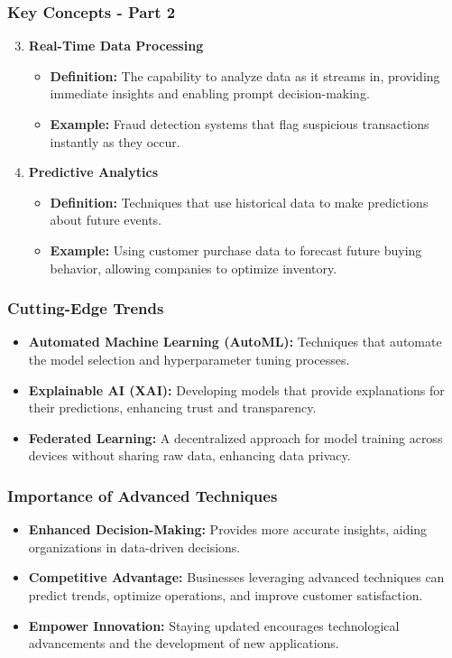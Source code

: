 \documentclass{beamer}
\begin{document}
\begin{frame}[fragile]
    \frametitle{Key Concepts - Part 2}
    \begin{enumerate}
        \setcounter{enumi}{2} %
        \item \textbf{Real-Time Data Processing}
        \begin{itemize}
            \item \textbf{Definition:} The capability to analyze data as it streams in, providing immediate insights and enabling prompt decision-making.
            \item \textbf{Example:} Fraud detection systems that flag suspicious transactions instantly as they occur.
        \end{itemize}

        \item \textbf{Predictive Analytics}
        \begin{itemize}
            \item \textbf{Definition:} Techniques that use historical data to make predictions about future events.
            \item \textbf{Example:} Using customer purchase data to forecast future buying behavior, allowing companies to optimize inventory.
        \end{itemize}
    \end{enumerate}
\end{frame}

\begin{frame}[fragile]
    \frametitle{Cutting-Edge Trends}
    \begin{itemize}
        \item \textbf{Automated Machine Learning (AutoML):} Techniques that automate the model selection and hyperparameter tuning processes.
        \item \textbf{Explainable AI (XAI):} Developing models that provide explanations for their predictions, enhancing trust and transparency.
        \item \textbf{Federated Learning:} A decentralized approach for model training across devices without sharing raw data, enhancing data privacy.
    \end{itemize}
\end{frame}

\begin{frame}[fragile]
    \frametitle{Importance of Advanced Techniques}
    \begin{itemize}
        \item \textbf{Enhanced Decision-Making:} Provides more accurate insights, aiding organizations in data-driven decisions.
        \item \textbf{Competitive Advantage:} Businesses leveraging advanced techniques can predict trends, optimize operations, and improve customer satisfaction.
        \item \textbf{Empower Innovation:} Staying updated encourages technological advancements and the development of new applications.
    \end{itemize}
\end{frame}
\end{document}
